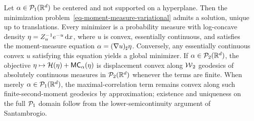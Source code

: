 \begin{prop}\label{prop-moment-hidden-convexity}
	Let $\alpha\in\mathcal{P}_1(\mathbb{R}^d)$ be centered and not supported on a hyperplane. Then the minimization problem~\eqref{eq-moment-measure-variational} admits a solution, unique up to translations. Every minimizer is a probability measure with log-concave density $\eta=Z_u^{-1}e^{-u}\,\mathrm{d} x$, where $u$ is convex, essentially continuous, and satisfies the moment-measure equation $\alpha=(\nabla u)_\sharp \eta$.
	Conversely, any essentially continuous convex $u$ satisfying this equation yields a global minimizer. If $\alpha\in\mathcal{P}_2(\mathbb{R}^d)$, the objective $\eta\mapsto\mathcal H(\eta)+\mathsf{MC}_\alpha(\eta)$ is displacement convex along $\operatorname{\mathcal{W}}_2$ geodesics of absolutely continuous measures in $\mathcal{P}_2(\mathbb{R}^d)$ whenever the terms are finite. When merely $\alpha\in\mathcal{P}_1(\mathbb{R}^d)$, the maximal-correlation term remains convex along such finite-second-moment geodesics by approximation; existence and uniqueness on the full $\mathcal{P}_1$ domain follow from the lower-semicontinuity argument of Santambrogio.
\end{prop}

